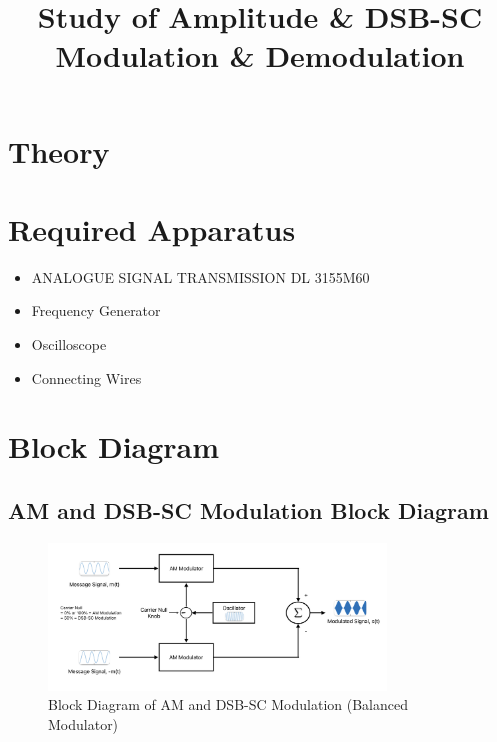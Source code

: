 \documentclass[12pt]{article}
\title{Study of Amplitude \& DSB-SC Modulation \& Demodulation}
\author{}
\date{}
\begin{document}


\pagebreak

\tableofcontents

\pagebreak
{}
\maketitle

\section*{Theory}

\section*{Required Apparatus}
\begin{itemize}
    \item ANALOGUE SIGNAL TRANSMISSION DL 3155M60
    \item Frequency Generator
    \item Oscilloscope
    \item Connecting Wires
\end{itemize}

\section*{Block Diagram}
\subsection*{AM and DSB-SC Modulation Block Diagram}
\begin{figure}[H]
    \centering
    \includegraphics[width=0.8\textwidth]{bm.png}
    \caption{Block Diagram of AM and DSB-SC Modulation (Balanced Modulator)}
    \label{fig:modulation_block_diagram}
\end{figure}
\end{document}
